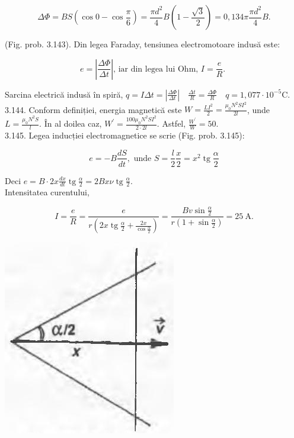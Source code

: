 \documentclass[10pt]{article}
\begin{document}
$$
\Delta \Phi=B S\left(\cos 0-\cos \frac{\pi}{6}\right)=\frac{\pi d^{2}}{4} B\left(1-\frac{\sqrt{3}}{2}\right)=0,134 \pi \frac{\pi d^{2}}{4} B .
$$

(Fig. prob. 3.143). Din legea Faraday, tensiunea electromotoare indusă este:

$$
e=\left|\frac{\Delta \Phi}{\Delta t}\right| \text {, iar din legea lui Ohm, } I=\frac{e}{R} \text {. }
$$

Sarcina electrică indusă în spiră, $q=I \Delta t=\left|\frac{\Delta \Phi}{\Delta t}\right| \quad \frac{\Delta t}{R}=\frac{\Delta \Phi}{R} \quad q=1,077 \cdot 10^{-5} \mathrm{C}$.\\
3.144. Conform definiției, energia magnetică este $W=\frac{L I^{2}}{2}=\frac{\mu_{0} N^{2} S I^{2}}{2 l}$, unde $L=\frac{\mu_{0} N^{2} S}{l}$. În al doilea caz, $W^{\prime}=\frac{100 \mu_{0} N^{2} S I^{2}}{2 \cdot 2 l}$. Astfel, $\frac{W^{\prime}}{W}=50$.\\
3.145. Legea inducției electromagnetice se scrie (Fig. prob. 3.145):

$$
e=-B \frac{d S}{d t}, \text { unde } S=\frac{l}{2} \frac{x}{2}=x^{2} \operatorname{tg} \frac{\alpha}{2}
$$

Deci $e=B \cdot 2 x \frac{d x}{d t} \operatorname{tg} \frac{\alpha}{2}=2 B x \nu \operatorname{tg} \frac{\alpha}{2}$.\\
Intensitatea curentului,

$$
I=\frac{e}{R}=\frac{e}{r\left(2 x \operatorname{tg} \frac{\alpha}{2}+\frac{2 x}{\cos \frac{\alpha}{2}}\right)}=\frac{B v \sin \frac{\alpha}{2}}{r\left(1+\sin \frac{\alpha}{2}\right)}=25 \mathrm{~A} .
$$

\begin{center}
\includegraphics[max width=\textwidth]{2025_07_01_5b3ff9fa0d508c8e9f17g-370}
\end{center}
\end{document}
